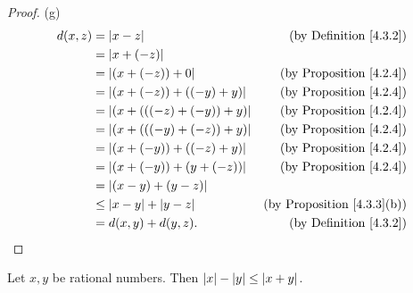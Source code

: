\begin{proof}{(g)}
    \begin{align*}
        d(x, z) & = \abs*{x - z}                    & \text{(by Definition \ref{4.3.2})}     \\
                & = \abs*{x + (-z)}                                                          \\
                & = \abs*{(x + (-z)) + 0}           & \text{(by Proposition \ref{4.2.4})}    \\
                & = \abs*{(x + (-z)) + ((-y) + y)}  & \text{(by Proposition \ref{4.2.4})}    \\
                & = \abs*{(x + (((-z) + (-y)) + y)} & \text{(by Proposition \ref{4.2.4})}    \\
                & = \abs*{(x + (((-y) + (-z)) + y)} & \text{(by Proposition \ref{4.2.4})}    \\
                & = \abs*{(x + (-y)) + ((-z) + y)}  & \text{(by Proposition \ref{4.2.4})}    \\
                & = \abs*{(x + (-y)) + (y + (-z))}  & \text{(by Proposition \ref{4.2.4})}    \\
                & = \abs*{(x - y) + (y - z)}                                                 \\
                & \leq \abs*{x - y} + \abs*{y - z}  & \text{(by Proposition \ref{4.3.3}(b))} \\
                & = d(x, y) + d(y, z).              & \text{(by Definition \ref{4.3.2})}     \\
    \end{align*}
\end{proof}

\begin{additional corollary}\label{ac 4.3.1}
Let \(x, y\) be rational numbers.
Then \(\abs*{x} - \abs*{y} \leq \abs*{x + y}\).
\end{additional corollary}


